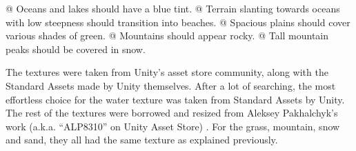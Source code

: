 \begin{easylist}
 @ Oceans and lakes should have a blue tint.
 @ Terrain slanting towards oceans with low steepness should transition into beaches.
 @ Spacious plains should cover various shades of green.
 @ Mountains should appear rocky.
 @ Tall mountain peaks should be covered in snow.
\end{easylist}


The textures were taken from Unity’s asset store community, along with the Standard Assets made by Unity themselves.
After a lot of searching, the most effortless choice for the water texture was taken from Standard Assets by Unity.
The rest of the textures were borrowed and resized from Aleksey Pakhalchyk's work (a.k.a. ``ALP8310''  on Unity Asset Store) \cite{ALP8310}.
For the grass, mountain, snow and sand, they all had the same texture as explained previously.
